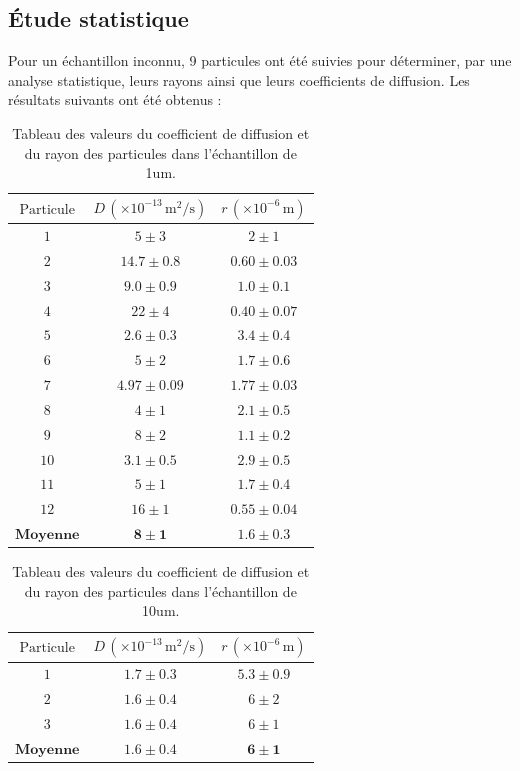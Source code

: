 \documentclass[11pt,letterpaper]{article}
\begin{document}
\subsection{Étude statistique}
Pour un échantillon inconnu, 9 particules ont été suivies pour déterminer, par une analyse statistique, leurs rayons ainsi que leurs coefficients de diffusion. 
Les résultats suivants ont été obtenus :

\begin{table}[H]
  \centering
  \caption{Tableau des valeurs du coefficient de diffusion et du rayon des particules dans l'échantillon de 1um.}
  \begin{tabular}{|c|c|c|}
  \hline
  \( \text{Particule} \) &\( D \, (\times 10^{-13} \, \text{m}^2/\text{s}) \) & \( r \, (\times 10^{-6} \, \text{m}) \) \\
  \hline
  \( 1 \) &\( 5 \pm 3 \) & \( 2 \pm 1 \) \\
  \( 2 \) &\( 14.7 \pm 0.8 \) & \( 0.60 \pm 0.03 \) \\
  \( 3 \) &\( 9.0 \pm 0.9 \) & \( 1.0 \pm 0.1 \) \\
  \( 4 \) &\( 22 \pm 4 \) & \( 0.40 \pm 0.07 \) \\
  \( 5 \) &\( 2.6 \pm 0.3 \) & \( 3.4 \pm 0.4 \) \\
  \( 6 \) &\( 5 \pm 2 \) & \( 1.7 \pm 0.6 \) \\
  \( 7 \) &\( 4.97 \pm 0.09 \) & \( 1.77 \pm 0.03 \) \\
  \( 8 \) &\( 4 \pm 1 \) & \( 2.1 \pm 0.5 \) \\
  \( 9 \) &\( 8 \pm 2 \) & \( 1.1 \pm 0.2 \) \\
  \( 10 \) &\( 3.1 \pm 0.5 \) & \( 2.9 \pm 0.5 \) \\
  \( 11 \) &\( 5 \pm 1 \) & \( 1.7 \pm 0.4 \) \\
  \( 12 \) &\( 16 \pm 1 \) & \( 0.55 \pm 0.04 \) \\
  \hline
  \hline
  \( \textbf{Moyenne} \) & \( \mathbf{8 \pm 1} \) & \( \mathbf{1.6 \pm 0.3} \) \\
  \hline
  \end{tabular}
\end{table}

\begin{table}[H]
  \centering
  \caption{Tableau des valeurs du coefficient de diffusion et du rayon des particules dans l'échantillon de 10um.}
  \begin{tabular}{|c|c|c|}
  \hline
  \( \text{Particule} \) &\( D \, (\times 10^{-13} \, \text{m}^2/\text{s}) \) & \( r \, (\times 10^{-6} \, \text{m}) \) \\
  \hline
  \( 1 \) &\( 1.7 \pm 0.3 \) & \( 5.3 \pm 0.9 \) \\
  \( 2 \) &\( 1.6 \pm 0.4 \) & \( 6 \pm 2 \) \\
  \( 3 \) &\( 1.6 \pm 0.4 \) & \( 6 \pm 1 \) \\
  \hline
  \hline
  \( \textbf{Moyenne} \) & \( \mathbf{1.6 \pm 0.4} \) & \( \mathbf{6 \pm 1} \) \\
  \hline
  \end{tabular}
\end{table}
\end{document}
